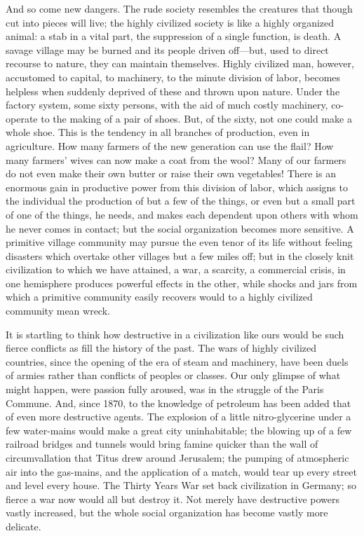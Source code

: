 \documentclass{book}
\begin{document}
And so come new dangers. The rude society resembles the creatures that though cut into pieces will live; the highly civilized society is like a highly organized animal: a stab in a vital part, the suppression of a single function, is death. A savage village may be burned and its people driven off—but, used to direct recourse to nature, they can maintain themselves. Highly civilized man, however, accustomed to capital, to machinery, to the minute division of labor, becomes helpless when suddenly deprived of these and thrown upon nature. Under the factory system, some sixty persons, with the aid of much costly machinery, co-operate to the making of a pair of shoes. But, of the sixty, not one could make a whole shoe. This is the tendency in all branches of production, even in agriculture. How many farmers of the new generation can use the flail? How many farmers’ wives can now make a coat from the wool? Many of our farmers do not even make their own butter or raise their own vegetables! There is an enormous gain in productive power from this division of labor, which assigns to the individual the production of but a few of the things, or even but a small part of one of the things, he needs, and makes each dependent upon others with whom he never comes in contact; but the social organization becomes more sensitive. A primitive village community may pursue the even tenor of its life without feeling disasters which overtake other villages but a few miles off; but in the closely knit civilization to which we have attained, a war, a scarcity, a commercial crisis, in one hemisphere produces powerful effects in the other, while shocks and jars from which a primitive community easily recovers would to a highly civilized community mean wreck.

It is startling to think how destructive in a civilization like ours would be such fierce conflicts as fill the history of the past. The wars of highly civilized countries, since the opening of the era of steam and machinery, have been duels of armies rather than conflicts of peoples or classes. Our only glimpse of what might happen, were passion fully aroused, was in the struggle of the Paris Commune. And, since 1870, to the knowledge of petroleum has been added that of even more destructive agents. The explosion of a little nitro-glycerine under a few water-mains would make a great city uninhabitable; the blowing up of a few railroad bridges and tunnels would bring famine quicker than the wall of circumvallation that Titus drew around Jerusalem; the pumping of atmospheric air into the gas-mains, and the application of a match, would tear up every street and level every house. The Thirty Years War set back civilization in Germany; so fierce a war now would all but destroy it. Not merely have destructive powers vastly increased, but the whole social organization has become vastly more delicate.
\end{document}
